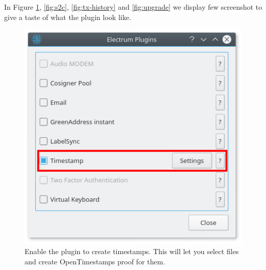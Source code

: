 In Figure \ref{fig:enable-plugin}, \ref{fig:s2c}, \ref{fig:tx-history} and \ref{fig:upgrade} we display few screenshot to give a taste of what the plugin look like.

\begin{figure}
	\begin{center}
		\includegraphics[width=0.5\linewidth]{Images/enable-plugin.png}
		\caption[Enable the plugin to create timestamps.]{Enable the plugin to create timestamps. This will let you select files and create OpenTimestamps proof for them.}
		\label{fig:enable-plugin}
	\end{center}
\end{figure} 

